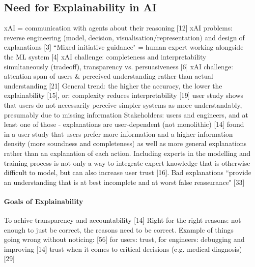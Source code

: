 \subsection{Need for Explainability in AI}
xAI = communication with agents about their reasoning [12] \newline
xAI problems: reverse engineering (model, decision, visualisation/representation) and design of explanations [3] \newline
``Mixed initiative guidance" = human expert working alongside the ML system [4] \newline
xAI challenge: completeness and interpretability simultaneously (tradeoff), transparency vs. persuasiveness [6] \newline
xAI challenge: attention span of users \& perceived understanding rather than actual understanding [21] \newline
General trend: the higher the accuracy, the lower the explainability [15], or: complexity reduces interpretability [19] \newline
[29] user study shows that users do not necessarily perceive simpler systems as more understandably, presumably due to missing information\newline
Stakeholders: users and engineers, and at least one of those - explanations are user-dependent (not monolithic) [14] \newline
[17] found in a user study that users prefer more information and a higher information density (more soundness and completeness) as well as more general explanations rather than an explanation of each action. \newline
Including experts in the modelling and training process is not only a way to integrate expert knowledge that is otherwise difficult to model, but can also increase user trust [16]. \newline
Bad explanations ``provide an understanding that is at best incomplete and at worst false reassurance" [33] \newline

\paragraph{Goals of Explainability}
To achive transparency and accountability [14] \newline
Right for the right reasons: not enough to just be correct, the reasons need to be correct. Example of things going wrong without noticing: [56] \newline
for users: trust, for engineers: debugging and improving [14]\newline
trust when it comes to critical decisions (e.g. medical diagnosis) [29] \newline

